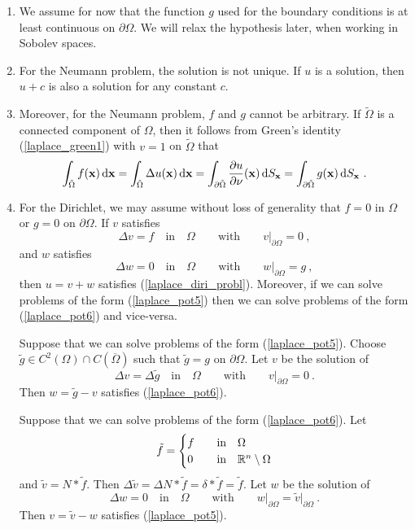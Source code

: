 \begin{enumerate}
\item We assume for now that the function $g$ used for the boundary
conditions is at least continuous on $\partial \Omega$.  We will
relax the hypothesis later, when working in Sobolev spaces.
\item For the Neumann problem, the solution is not unique.  If $u$ is
a solution, then $u+c$ is also a solution for any constant $c$.
\item Moreover, for the Neumann problem, $f$ and $g$ cannot be
arbitrary.  If $\tilde{\Omega}$ is a connected component of $\Omega$, then it
follows from Green's identity (\ref{laplace_green1}) with $v=1$ on
$\tilde{\Omega}$ that
\[
\int_{\tilde{\Omega}} f(\VEC{x}) \dx{\VEC{x}}
= \int_{\tilde{\Omega}} \Delta u(\VEC{x}) \dx{\VEC{x}}
= \int_{\partial \tilde{\Omega}} \pdydx{u}{\VEC{\nu}}(\VEC{x}) \dss{S}{x}
= \int_{\partial \tilde{\Omega}} g(\VEC{x}) \dss{S}{x} \ .
\]
\item For the Dirichlet, we may assume without loss of generality that
$f=0$ in $\Omega$ or $g=0$ on $\partial \Omega$.
If $v$ satisfies
\begin{equation} \label{laplace_pot5}
\Delta v = f \quad \text{in} \quad \Omega \qquad \text{with}
\qquad v\big|_{\partial \Omega} = 0 \ ,
\end{equation}
and $w$ satisfies
\begin{equation} \label{laplace_pot6}
\Delta w = 0 \quad \text{in} \quad \Omega \qquad \text{with}
\qquad w\big|_{\partial \Omega} = g \ ,
\end{equation}
then $u=v+w$ satisfies (\ref{laplace_diri_probl}).  Moreover, if we
can solve problems of the form (\ref{laplace_pot5}) then we can solve
problems of the form (\ref{laplace_pot6}) and vice-versa.

Suppose that we can solve problems of the form (\ref{laplace_pot5}).
Choose $\displaystyle \tilde{g} \in C^2(\Omega) \cap C(\overline{\Omega})$
such that $\tilde{g} = g$ on $\partial \Omega$.  Let $v$ be the solution of
\[
\Delta v = \Delta \tilde{g} \quad \text{in} \quad \Omega \qquad \text{with}
\qquad v\big|_{\partial \Omega} = 0 \ .
\]
Then $w=\tilde{g}-v$ satisfies (\ref{laplace_pot6}).

Suppose that we can solve problems of the form (\ref{laplace_pot6}).
Let
\[
\tilde{f} =
\begin{cases}
f & \quad \text{in} \quad \Omega \\
0 & \quad \text{in} \quad \mathbb{R}^n\setminus \Omega
\end{cases}
\]
and $\tilde{v} = N\ast \tilde{f}$.  Then
$\displaystyle
\Delta \tilde{v} = \Delta N \ast \tilde{f} = \delta \ast \tilde{f} =
\tilde{f}$.  Let $w$ be the solution of
\[
\Delta w = 0 \quad \text{in} \quad \Omega \qquad \text{with}
\qquad w\big|_{\partial \Omega} = \tilde{v}\big|_{\partial \Omega} \ .
\]
Then $v=\tilde{v}-w$ satisfies (\ref{laplace_pot5}).


\end{enumerate}
